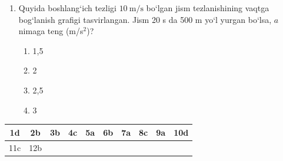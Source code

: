 \begin{enumerate}
\item Quyida boshlang‘ich tezligi $10\ \text{m/s}$ bo‘lgan jism tezlanishining 
vaqtga bog‘lanish grafigi tasvirlangan. 
Jism 20 s da 500 m yo‘l yurgan bo‘lsa, $a$ nimaga teng (m/s$^2$)?


\begin{enumerate}[label=\Alph*)]
\item 1,5
\item 2
\item 2,5
\item 3
\end{enumerate}

\end{enumerate}



\begin{table}[h!]
\centering
\begin{tabular}{|c|c|c|c|c|c|c|c|c|c|}
\hline
1d & 2b & 3b & 4c & 5a & 6b & 7a & 8c & 9a & 10d \\ \hline
11c & 12b &  &  &  &  &  &  &  &  \\ \hline
\end{tabular}
\end{table}